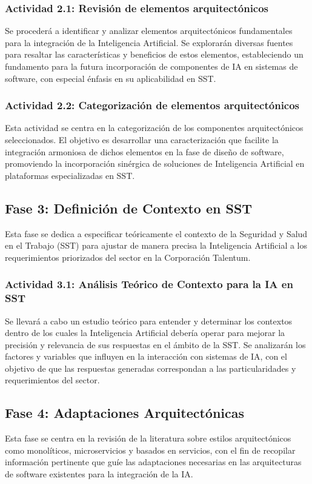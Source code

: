 \subsubsection{Actividad 2.1: Revisión de elementos arquitectónicos}
Se procederá a identificar y analizar elementos arquitectónicos fundamentales para la integración de la Inteligencia Artificial. Se explorarán diversas fuentes para resaltar las características y beneficios de estos elementos, estableciendo un fundamento para la futura incorporación de componentes de IA en sistemas de software, con especial énfasis en su aplicabilidad en SST.

\subsubsection{Actividad 2.2: Categorización de elementos arquitectónicos}
Esta actividad se centra en la categorización de los componentes arquitectónicos seleccionados. El objetivo es desarrollar una caracterización que facilite la integración armoniosa de dichos elementos en la fase de diseño de software, promoviendo la incorporación sinérgica de soluciones de Inteligencia Artificial en plataformas especializadas en SST.





\subsection{Fase 3: Definición de Contexto en SST}
Esta fase se dedica a especificar teóricamente el contexto de la Seguridad y Salud en el Trabajo (SST) para ajustar de manera precisa la Inteligencia Artificial a los requerimientos priorizados del sector en la Corporación Talentum.

\subsubsection{Actividad 3.1: Análisis Teórico de Contexto para la IA en SST}
Se llevará a cabo un estudio teórico para entender y determinar los contextos dentro de los cuales la Inteligencia Artificial debería operar para mejorar la precisión y relevancia de sus respuestas en el ámbito de la SST. Se analizarán los factores y variables que influyen en la interacción con sistemas de IA, con el objetivo de que las respuestas generadas correspondan a las particularidades y requerimientos del sector.




\subsection{Fase 4: Adaptaciones Arquitectónicas}
Esta fase se centra en la revisión de la literatura sobre estilos arquitectónicos como monolíticos, microservicios y basados en servicios, con el fin de recopilar información pertinente que guíe las adaptaciones necesarias en las arquitecturas de software existentes para la integración de la IA.

